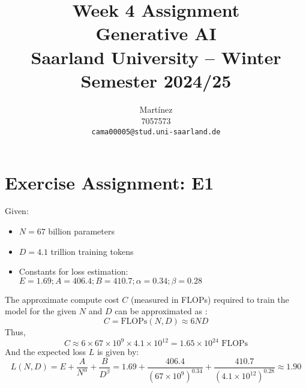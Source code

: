 \documentclass{article}
\title{Week 4 Assignment\\
\vspace{2mm}
\small{Generative AI}
\\
\vspace{2mm}
\small{Saarland University -- Winter Semester 2024/25}
}
\author{%
  Martínez \\
  7057573 \\
  \texttt{cama00005@stud.uni-saarland.de} \\
}
\begin{document}
\DeclareRobustCommand{\textitbf}[1]{\textbf{\textit{#1}}} %

\maketitle

\section{Exercise Assignment: E1}\label{sec:e1}
Given:
\begin{itemize}
    \item $N = 67$ billion parameters
    \item $D = 4.1$ trillion training tokens
    \item Constants for loss estimation: $E = 1.69; A = 406.4; B = 410.7; \alpha = 0.34; \beta = 0.28$
\end{itemize}

The approximate compute cost $C$ (measured in FLOPs) required to train the model for the given $N$ and $D$ can be approximated as \cite{kaplan2020}:
\[
    C = \text{FLOPs}(N, D) \approx 6ND
\]
Thus,
\[
    C \approx 6 \times 67 \times 10^9 \times 4.1 \times 10^{12} = 1.65 \times 10^{24} \text{ FLOPs}
\]
And the expected loss $L$ is given by:
\[
    L(N,D) = E + \frac{A}{N^\alpha} + \frac{B}{D^\beta} = 1.69 + \frac{406.4}{(67 \times 10^9)^{0.34}} + \frac{410.7}{(4.1 \times 10^{12})^{0.28}} \approx 1.90
\]
\end{document}
